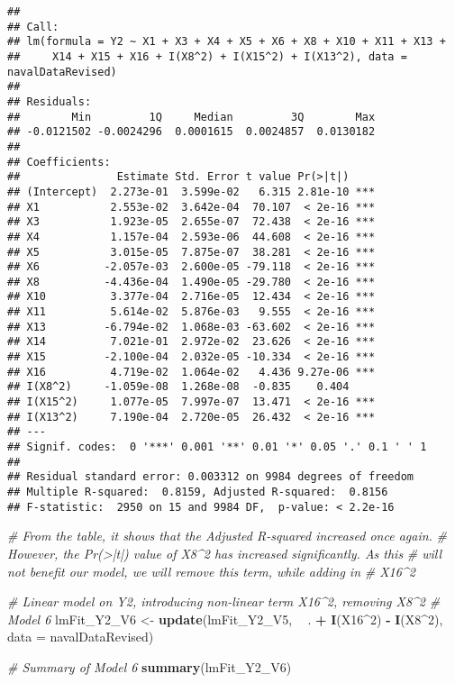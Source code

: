 \documentclass[
]{article}
\newenvironment{Shaded}{\begin{snugshade}}{\end{snugshade}}
\newcommand{\CommentTok}[1]{\textcolor[rgb]{0.56,0.35,0.01}{\textit{#1}}}
\newcommand{\DataTypeTok}[1]{\textcolor[rgb]{0.13,0.29,0.53}{#1}}
\newcommand{\DecValTok}[1]{\textcolor[rgb]{0.00,0.00,0.81}{#1}}
\newcommand{\KeywordTok}[1]{\textcolor[rgb]{0.13,0.29,0.53}{\textbf{#1}}}
\newcommand{\NormalTok}[1]{#1}
\newcommand{\OperatorTok}[1]{\textcolor[rgb]{0.81,0.36,0.00}{\textbf{#1}}}
\newcommand{\StringTok}[1]{\textcolor[rgb]{0.31,0.60,0.02}{#1}}
\begin{document}
\begin{verbatim}
## 
## Call:
## lm(formula = Y2 ~ X1 + X3 + X4 + X5 + X6 + X8 + X10 + X11 + X13 + 
##     X14 + X15 + X16 + I(X8^2) + I(X15^2) + I(X13^2), data = navalDataRevised)
## 
## Residuals:
##        Min         1Q     Median         3Q        Max 
## -0.0121502 -0.0024296  0.0001615  0.0024857  0.0130182 
## 
## Coefficients:
##               Estimate Std. Error t value Pr(>|t|)    
## (Intercept)  2.273e-01  3.599e-02   6.315 2.81e-10 ***
## X1           2.553e-02  3.642e-04  70.107  < 2e-16 ***
## X3           1.923e-05  2.655e-07  72.438  < 2e-16 ***
## X4           1.157e-04  2.593e-06  44.608  < 2e-16 ***
## X5           3.015e-05  7.875e-07  38.281  < 2e-16 ***
## X6          -2.057e-03  2.600e-05 -79.118  < 2e-16 ***
## X8          -4.436e-04  1.490e-05 -29.780  < 2e-16 ***
## X10          3.377e-04  2.716e-05  12.434  < 2e-16 ***
## X11          5.614e-02  5.876e-03   9.555  < 2e-16 ***
## X13         -6.794e-02  1.068e-03 -63.602  < 2e-16 ***
## X14          7.021e-01  2.972e-02  23.626  < 2e-16 ***
## X15         -2.100e-04  2.032e-05 -10.334  < 2e-16 ***
## X16          4.719e-02  1.064e-02   4.436 9.27e-06 ***
## I(X8^2)     -1.059e-08  1.268e-08  -0.835    0.404    
## I(X15^2)     1.077e-05  7.997e-07  13.471  < 2e-16 ***
## I(X13^2)     7.190e-04  2.720e-05  26.432  < 2e-16 ***
## ---
## Signif. codes:  0 '***' 0.001 '**' 0.01 '*' 0.05 '.' 0.1 ' ' 1
## 
## Residual standard error: 0.003312 on 9984 degrees of freedom
## Multiple R-squared:  0.8159, Adjusted R-squared:  0.8156 
## F-statistic:  2950 on 15 and 9984 DF,  p-value: < 2.2e-16
\end{verbatim}

\begin{Shaded}
\begin{Highlighting}[]
\CommentTok{# From the table, it shows that the Adjusted R-squared increased once again.}
\CommentTok{# However, the Pr(>|t|) value of X8^2 has increased significantly. As this}
\CommentTok{# will not benefit our model, we will remove this term, while adding in}
\CommentTok{# X16^2}

\CommentTok{# Linear model on Y2, introducing non-linear term X16^2, removing X8^2}
\CommentTok{# Model 6}
\NormalTok{lmFit_Y2_V6 <-}\StringTok{ }\KeywordTok{update}\NormalTok{(lmFit_Y2_V5, }\OperatorTok{~}\StringTok{ }\NormalTok{. }\OperatorTok{+}\StringTok{ }\KeywordTok{I}\NormalTok{(X16}\OperatorTok{^}\DecValTok{2}\NormalTok{) }\OperatorTok{-}\StringTok{ }\KeywordTok{I}\NormalTok{(X8}\OperatorTok{^}\DecValTok{2}\NormalTok{), }\DataTypeTok{data =}\NormalTok{ navalDataRevised)}

\CommentTok{# Summary of Model 6}
\KeywordTok{summary}\NormalTok{(lmFit_Y2_V6)}
\end{Highlighting}
\end{Shaded}
\end{document}
